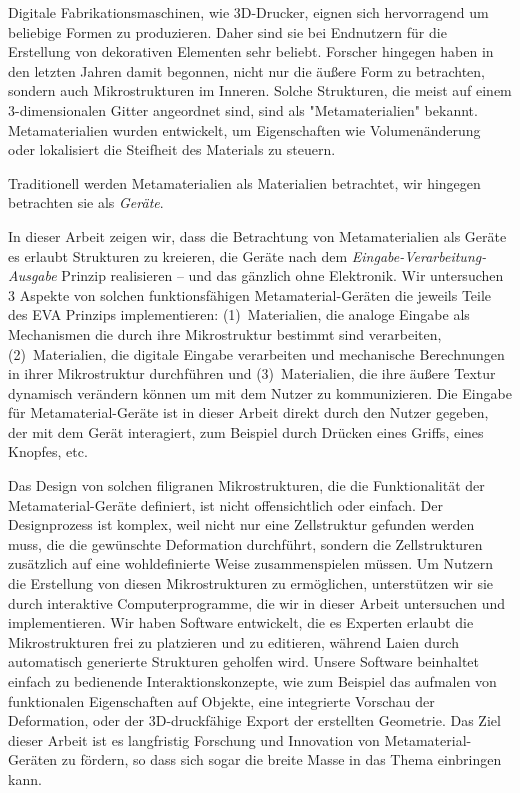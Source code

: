 
Digitale Fabrikationsmaschinen, wie 3D-Drucker, eignen sich hervorragend um beliebige Formen zu produzieren. 
Daher sind sie bei Endnutzern für die Erstellung von dekorativen Elementen sehr beliebt. 
Forscher hingegen haben in den letzten Jahren damit begonnen, nicht nur die äußere Form zu betrachten, sondern auch Mikrostrukturen im Inneren. 
Solche Strukturen, die meist auf einem 3-dimensionalen Gitter angeordnet sind, sind als "Metamaterialien" bekannt.
Metamaterialien wurden entwickelt, um Eigenschaften wie Volumenänderung oder lokalisiert die Steifheit des Materials zu steuern.

Traditionell werden Metamaterialien als Materialien betrachtet, wir hingegen betrachten sie als \textit{Geräte}.

In dieser Arbeit zeigen wir, dass die Betrachtung von Metamaterialien als Geräte es erlaubt Strukturen zu kreieren, die Geräte nach dem \textit{Eingabe-Verarbeitung-Ausgabe} Prinzip realisieren -- und das gänzlich ohne Elektronik.
Wir untersuchen 3 Aspekte von solchen funktionsfähigen Meta\-material-Geräten die jeweils Teile des EVA Prinzips implementieren: 
(1)~Materialien, die analoge Eingabe als Mechanismen die durch ihre Mikrostruktur bestimmt sind verarbeiten, 
(2)~Materialien, die digitale Eingabe verarbeiten und mechanische Berechnungen in ihrer Mikrostruktur durchführen und 
(3)~Materialien, die ihre äußere Textur dynamisch verändern können um mit dem Nutzer zu kommunizieren.
Die Eingabe für Meta\-ma\-te\-rial-Geräte ist in dieser Arbeit direkt durch den Nutzer gegeben, der mit dem Gerät interagiert, zum Beispiel durch Drücken eines Griffs, eines Knopfes, etc.

Das Design von solchen filigranen Mikrostrukturen, die die Funktionalität der Metamaterial-Geräte definiert, ist nicht offensichtlich oder einfach.
Der Designprozess ist komplex, weil nicht nur eine Zellstruktur gefunden werden muss, die die gewünschte Deformation durchführt, sondern die Zellstrukturen zusätzlich auf eine wohldefinierte Weise zusammenspielen müssen. 
Um Nutzern die Erstellung von diesen Mikrostrukturen zu ermöglichen, unterstützen wir sie durch interaktive Computerprogramme, die wir in dieser Arbeit untersuchen und implementieren. 
Wir haben Software entwickelt, die es Experten erlaubt die Mikrostrukturen frei zu platzieren und zu editieren, während Laien durch automatisch generierte Strukturen geholfen wird. 
Unsere Software beinhaltet einfach zu bedienende Interaktionskonzepte, wie zum Beispiel das aufmalen von funktionalen Eigenschaften auf Objekte, eine integrierte Vorschau der Deformation, oder der 3D-druckfähige Export der erstellten Geometrie. 
Das Ziel dieser Arbeit ist es langfristig Forschung und Innovation von Metamaterial-Geräten zu fördern, so dass sich sogar die breite Masse in das Thema einbringen kann. 
